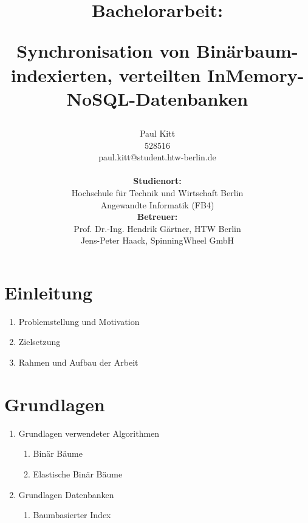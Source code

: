 \documentclass[a4paper,11pt,oneside,%
headsepline,												%
footsepline,												%
bibtotocnumbered									%
]{scrreprt}
\begin{document}
\title{{\bf Bachelorarbeit:} \\ \begin{large}Synchronisation von Binärbaum-indexierten, verteilten
InMemory-NoSQL-Datenbanken\end{large}}
\author{
	Paul Kitt \\
	528516   \\	
	paul.kitt@student.htw-berlin.de	\\
\\
\textbf{Studienort:}	\\
	Hochschule für Technik und Wirtschaft Berlin \\
	Angewandte Informatik (FB4) \\
	\textbf{Betreuer:} \\
	Prof. Dr.-Ing. Hendrik Gärtner, HTW Berlin \\
	Jens-Peter Haack,  SpinningWheel GmbH
}


\maketitle
\tableofcontents

\chapter{Einleitung}
 		\begin{enumerate}[1.]
			\item  Problemstellung und Motivation
			\item Zielsetzung
			\item Rahmen und Aufbau der Arbeit
		\end{enumerate}
\chapter{Grundlagen}

	\begin{enumerate}[1.]
			\item Grundlagen verwendeter Algorithmen
			\begin{enumerate}[1.]
			\item Binär Bäume
			\item Elastische Binär Bäume
			\end{enumerate}
			\item Grundlagen Datenbanken
			\begin{enumerate}[1.]
			\item Baumbasierter Index
			\end{enumerate}
		\end{enumerate}
\end{document}
